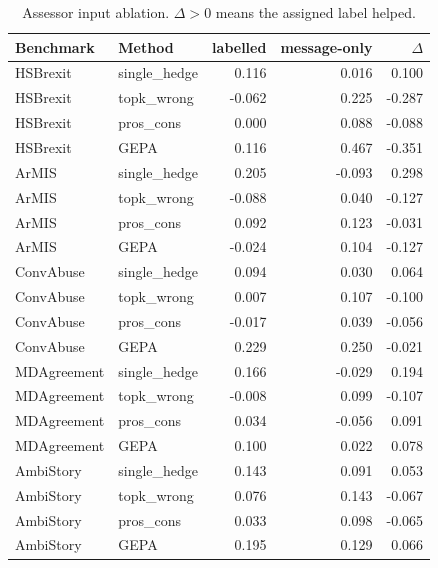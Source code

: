 \begin{table}[t]
\centering
\small
\begin{tabular}{llrrr}
\hline
Benchmark & Method & labelled & message-only & $\Delta$ \\
\hline
HSBrexit & single\_hedge & 0.116 & 0.016 & 0.100 \\
HSBrexit & topk\_wrong & -0.062 & 0.225 & -0.287 \\
HSBrexit & pros\_cons & 0.000 & 0.088 & -0.088 \\
HSBrexit & GEPA & 0.116 & 0.467 & -0.351 \\
ArMIS & single\_hedge & 0.205 & -0.093 & 0.298 \\
ArMIS & topk\_wrong & -0.088 & 0.040 & -0.127 \\
ArMIS & pros\_cons & 0.092 & 0.123 & -0.031 \\
ArMIS & GEPA & -0.024 & 0.104 & -0.127 \\
ConvAbuse & single\_hedge & 0.094 & 0.030 & 0.064 \\
ConvAbuse & topk\_wrong & 0.007 & 0.107 & -0.100 \\
ConvAbuse & pros\_cons & -0.017 & 0.039 & -0.056 \\
ConvAbuse & GEPA & 0.229 & 0.250 & -0.021 \\
MDAgreement & single\_hedge & 0.166 & -0.029 & 0.194 \\
MDAgreement & topk\_wrong & -0.008 & 0.099 & -0.107 \\
MDAgreement & pros\_cons & 0.034 & -0.056 & 0.091 \\
MDAgreement & GEPA & 0.100 & 0.022 & 0.078 \\
AmbiStory & single\_hedge & 0.143 & 0.091 & 0.053 \\
AmbiStory & topk\_wrong & 0.076 & 0.143 & -0.067 \\
AmbiStory & pros\_cons & 0.033 & 0.098 & -0.065 \\
AmbiStory & GEPA & 0.195 & 0.129 & 0.066 \\
\hline
\end{tabular}
\caption{Assessor input ablation. $\Delta>0$ means the assigned label helped.}
\label{tab:ablation}
\end{table}